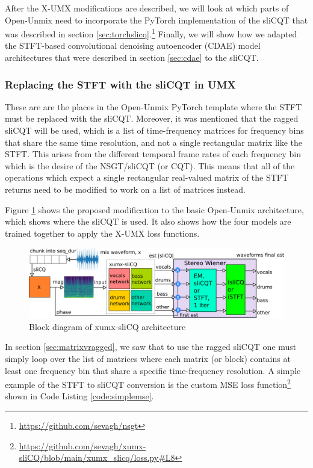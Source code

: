 \documentclass[report.tex]{subfiles}
\begin{document}
After the X-UMX modifications are described, we will look at which parts of Open-Unmix need to incorporate the PyTorch implementation of the sliCQT that was described in section \ref{sec:torchslicq}.\footnote{\url{https://github.com/sevagh/nsgt}} Finally, we will show how we adapted the STFT-based convolutional denoising autoencoder (CDAE) model architectures that were described in section \ref{sec:cdae} to the sliCQT.

\subsubsection{Replacing the STFT with the sliCQT in UMX}
\label{sec:replacestft}


These are are the places in the Open-Unmix PyTorch template where the STFT must be replaced with the sliCQT. Moreover, it was mentioned that the ragged sliCQT will be used, which is a list of time-frequency matrices for frequency bins that share the same time resolution, and not a single rectangular matrix like the STFT. This arises from the different temporal frame rates of each frequency bin which is the desire of the NSGT/sliCQT (or CQT). This means that all of the operations which expect a single rectangular real-valued matrix of the STFT returns need to be modified to work on a list of matrices instead.

Figure \ref{fig:xumxslicq} shows the proposed modification to the basic Open-Unmix architecture, which shows where the sliCQT is used. It also shows how the four models are trained together to apply the X-UMX loss functions.

\begin{figure}[ht]
	\centering
	\includegraphics[width=\textwidth]{./images-blockdiagrams/xumx_slicq_system_compressed_largefont.png}
	\caption{Block diagram of xumx-sliCQ architecture}
	\label{fig:xumxslicq}
\end{figure}

In section \ref{sec:matrixvragged}, we saw that to use the ragged sliCQT one must simply loop over the list of matrices where each matrix (or block) contains at least one frequency bin that share a specific time-frequency resolution. A simple example of the STFT to sliCQT conversion is the custom MSE loss function\footnote{\url{https://github.com/sevagh/xumx-sliCQ/blob/main/xumx_slicq/loss.py\#L8}} shown in Code Listing \ref{code:simplemse}.
\end{document}
